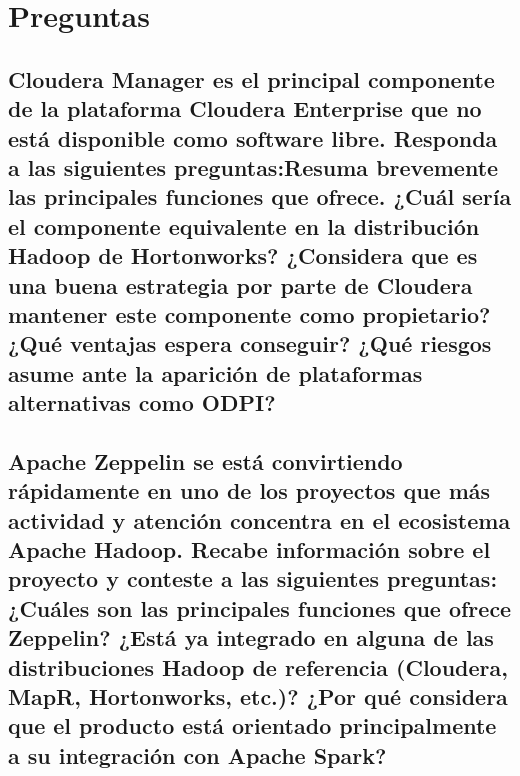 \documentclass[12pt,a4paper,twoside,openright,titlepage,final]{article}
\author{José Ignacio Escribano}
\title{}
\begin{document}
\setcounter{page}{1}


\tableofcontents
\thispagestyle{empty}
\newpage

\setcounter{page}{1}


\section{Preguntas}

\subsection{Cloudera Manager es el principal componente de la plataforma Cloudera Enterprise que no está disponible como software libre. Responda a las siguientes preguntas:Resuma brevemente las principales funciones que ofrece. ¿Cuál sería el componente equivalente en la distribución Hadoop de Hortonworks? ¿Considera que es una buena estrategia por parte de Cloudera mantener este componente como propietario? ¿Qué ventajas espera conseguir? ¿Qué riesgos asume ante la aparición de plataformas alternativas como ODPI?}



\subsection{Apache Zeppelin se está convirtiendo rápidamente en uno de los proyectos que más actividad y atención concentra en el ecosistema Apache Hadoop. Recabe información sobre el proyecto y conteste a las siguientes preguntas: ¿Cuáles son las principales funciones que ofrece Zeppelin? ¿Está ya integrado en alguna de las distribuciones Hadoop de referencia (Cloudera, MapR, Hortonworks, etc.)? ¿Por qué considera que el producto está orientado principalmente a su integración con Apache Spark?}
\end{document}
